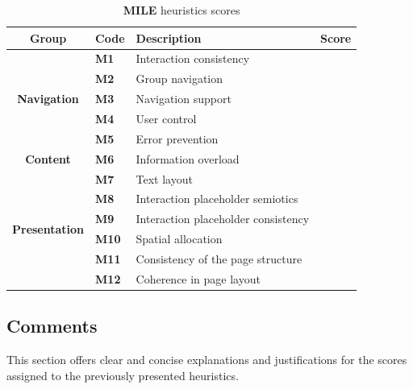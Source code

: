 \begin{table}[htp!]
    \centering
    \begin{tabular}{ |c|l|l|c| }
        \hline
        \textbf{Group} & \textbf{Code} & \textbf{Description} & \textbf{Score}\\
        \hline
        \multirow{5}{*}{\textbf{Navigation}} & \textbf{M1} & Interaction consistency & \textbf{\color{unicefGreen}{4}}\\
        \cline{2-4}
        & \textbf{M2} & Group navigation & \textbf{\color{unicefRed}{2}}\\
        \cline{2-4}
        & \textbf{M3} & Navigation support & \textbf{\color{unicefRed}{2}}\\
        \cline{2-4}
        & \textbf{M4} & User control & \textbf{\color{unicefRed}{1}}\\
        \cline{2-4}
        & \textbf{M5} & Error prevention & \textbf{\color{unicefOrange}{3}}\\
        \hline
        \textbf{Content} & \textbf{M6} & Information overload & \textbf{\color{unicefOrange}{3}}\\
        \hline
        \multirow{6}{*}{\textbf{Presentation}} & \textbf{M7} & Text layout & \textbf{\color{unicefGreen}{5}}\\
        \cline{2-4}
        & \textbf{M8} & Interaction placeholder semiotics & \textbf{\color{unicefGreen}{5}}\\
        \cline{2-4}
        & \textbf{M9} & Interaction placeholder consistency & \textbf{\color{unicefGreen}{5}}\\
        \cline{2-4}
        & \textbf{M10} & Spatial allocation & \textbf{\color{unicefGreen}{4}}\\
        \cline{2-4}
        & \textbf{M11} & Consistency of the page structure & \textbf{\color{unicefGreen}{4}}\\
        \cline{2-4}
        & \textbf{M12} & Coherence in page layout & \textbf{\color{unicefGreen}{5}}\\
        \hline
    \end{tabular}
    \caption{\textbf{MILE} heuristics scores}
\end{table}
\newpage
\subsection{Comments}
This section offers clear and concise explanations and justifications for the scores assigned to the previously presented heuristics.
